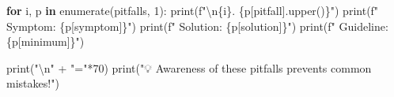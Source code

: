 \documentclass[
  11pt,
  letterpaper,
  oneside,
  openany]{book}
\newenvironment{Shaded}{\begin{snugshade}}{\end{snugshade}}
\newcommand{\BuiltInTok}[1]{\textcolor[rgb]{0.00,0.23,0.31}{#1}}
\newcommand{\CharTok}[1]{\textcolor[rgb]{0.13,0.47,0.30}{#1}}
\newcommand{\ControlFlowTok}[1]{\textcolor[rgb]{0.00,0.23,0.31}{\textbf{#1}}}
\newcommand{\DecValTok}[1]{\textcolor[rgb]{0.68,0.00,0.00}{#1}}
\newcommand{\KeywordTok}[1]{\textcolor[rgb]{0.00,0.23,0.31}{\textbf{#1}}}
\newcommand{\NormalTok}[1]{\textcolor[rgb]{0.00,0.23,0.31}{#1}}
\newcommand{\OperatorTok}[1]{\textcolor[rgb]{0.37,0.37,0.37}{#1}}
\newcommand{\SpecialCharTok}[1]{\textcolor[rgb]{0.37,0.37,0.37}{#1}}
\newcommand{\SpecialStringTok}[1]{\textcolor[rgb]{0.13,0.47,0.30}{#1}}
\newcommand{\StringTok}[1]{\textcolor[rgb]{0.13,0.47,0.30}{#1}}
\begin{document}
\begin{Shaded}
\begin{Highlighting}[]
\ControlFlowTok{for}\NormalTok{ i, p }\KeywordTok{in} \BuiltInTok{enumerate}\NormalTok{(pitfalls, }\DecValTok{1}\NormalTok{):}
    \BuiltInTok{print}\NormalTok{(}\SpecialStringTok{f"}\CharTok{\textbackslash{}n}\SpecialCharTok{\{}\NormalTok{i}\SpecialCharTok{\}}\SpecialStringTok{. }\SpecialCharTok{\{}\NormalTok{p[}\StringTok{\textquotesingle{}pitfall\textquotesingle{}}\NormalTok{]}\SpecialCharTok{.}\NormalTok{upper()}\SpecialCharTok{\}}\SpecialStringTok{"}\NormalTok{)}
    \BuiltInTok{print}\NormalTok{(}\SpecialStringTok{f"   Symptom: }\SpecialCharTok{\{}\NormalTok{p[}\StringTok{\textquotesingle{}symptom\textquotesingle{}}\NormalTok{]}\SpecialCharTok{\}}\SpecialStringTok{"}\NormalTok{)}
    \BuiltInTok{print}\NormalTok{(}\SpecialStringTok{f"   Solution: }\SpecialCharTok{\{}\NormalTok{p[}\StringTok{\textquotesingle{}solution\textquotesingle{}}\NormalTok{]}\SpecialCharTok{\}}\SpecialStringTok{"}\NormalTok{)}
    \BuiltInTok{print}\NormalTok{(}\SpecialStringTok{f"   Guideline: }\SpecialCharTok{\{}\NormalTok{p[}\StringTok{\textquotesingle{}minimum\textquotesingle{}}\NormalTok{]}\SpecialCharTok{\}}\SpecialStringTok{"}\NormalTok{)}

\BuiltInTok{print}\NormalTok{(}\StringTok{"}\CharTok{\textbackslash{}n}\StringTok{"} \OperatorTok{+} \StringTok{"="}\OperatorTok{*}\DecValTok{70}\NormalTok{)}
\BuiltInTok{print}\NormalTok{(}\StringTok{"💡 Awareness of these pitfalls prevents common mistakes!"}\NormalTok{)}
\end{Highlighting}
\end{Shaded}
\end{document}
